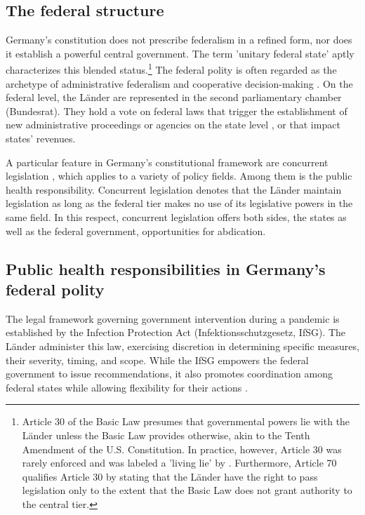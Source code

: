 \documentclass[authoryear,12pt, 3p]{elsarticle} %
\theoremstyle{break}
\begin{document}
\subsection[The federal structure]{The federal structure}\label{FederalStructure}
Germany's constitution does not prescribe federalism in a refined form, nor does it establish a powerful central government. The term 'unitary federal state' \citep{Hesse1962, Turner2013} aptly characterizes this blended status.\footnote{
	Article 30 of the Basic Law presumes that governmental powers lie with the Länder unless the Basic Law provides otherwise, akin to the Tenth Amendment of the U.S. Constitution. In practice, however, Article 30 was rarely enforced and was labeled a 'living lie' by \cite{Scharpf1994}. Furthermore, Article 70 qualifies Article 30 by stating that the Länder have the right to pass legislation only to the extent that the Basic Law does not grant authority to the central tier.
} The federal polity is often regarded as the archetype of administrative federalism and cooperative decision-making \citep{Kropp2016}. On the federal level, the Länder are represented in the second parliamentary chamber (Bundesrat). They hold a vote on federal laws that trigger the establishment of new administrative proceedings or agencies on the state level \citep{Burkhart2008}, or that impact states' revenues. 

A particular feature in Germany's constitutional framework are concurrent legislation \citep{Gunlicks2007}, which applies to a variety of policy fields. Among them is the public health responsibility. Concurrent legislation denotes that the Länder maintain legislation as long as the federal tier makes no use of its legislative powers in the same field. In this respect, concurrent legislation offers both sides, the states as well as the federal government, opportunities for abdication.

\subsection{Public health responsibilities in Germany's federal polity}
The legal framework governing government intervention during a pandemic is established by the Infection Protection Act (Infektionsschutzgesetz, IfSG). The Länder administer this law, exercising discretion in determining specific measures, their severity, timing, and scope. While the IfSG empowers the federal government to issue recommendations, it also promotes coordination among federal states while allowing flexibility for their actions \citep{Tonti2022}.  
\end{document}
